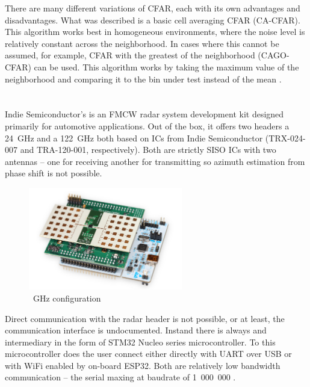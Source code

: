 There are many different variations of CFAR, each with its own advantages and disadvantages.
What was described is a basic cell averaging CFAR (CA-CFAR).
This algorithm works best in homogeneous environments, where the noise level is relatively constant across the neighborhood.
In cases where this cannot be assumed, for example, CFAR with the greatest of the neighborhood (CAGO-CFAR) can be used.
This algorithm works by taking the maximum value of the neighborhood and comparing it to the bin under test instead of the mean \cite{rohling1983}.

\chapter{\sidar}

Indie Semiconductor's \sidar is an FMCW radar system development kit designed primarily for automotive applications.
Out of the box, it offers two headers a 24~GHz and a 122~GHz both based on ICs from Indie Semiconductor (TRX-024-007 and TRA-120-001, respectively).
Both are strictly SISO ICs with two antennas -- one for receiving another for transmitting so azimuth estimation from phase shift is not possible.

\begin{figure}[h!]
  \centering
  \includegraphics[width=0.6\textwidth]{../img/sidar.png}

  \caption[~GHz configuration \cite{sidarMANOld}]{~GHz configuration \cite{sidarMANOld}}
  \label{fig:sidar}
\end{figure}

Direct communication with the radar header is not possible, or at least, the communication interface is undocumented.
Instand there is always and intermediary in the form of  STM32 Nucleo series microcontroller.
To this microcontroller does the user connect either directly with UART over USB or with WiFi enabled by on-board ESP32.
Both are relatively low bandwidth communication -- the serial maxing at baudrate of 1~000~000 \cite{sidarMAN}.

